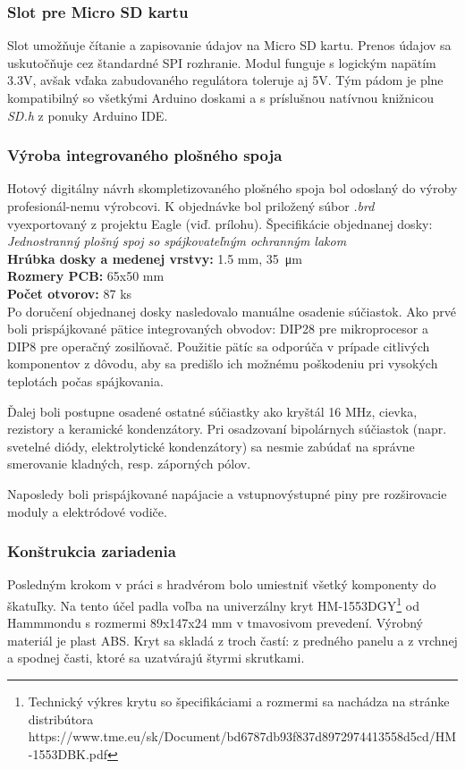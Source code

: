 \documentclass[titlepage,12pt]{article}
\begin{document}
\subsubsection*{Slot pre Micro SD kartu}
Slot umožňuje čítanie a zapisovanie údajov na Micro SD kartu. Prenos údajov sa uskutočňuje cez štandardné SPI rozhranie. Modul funguje s logickým napätím 3.3V, avšak vďaka zabudovaného regulátora toleruje aj 5V. Tým pádom je plne kompatibilný so všetkými Arduino doskami a s príslušnou natívnou knižnicou \emph{SD.h} z ponuky Arduino IDE.

\subsubsection*{Výroba integrovaného plošného spoja}
Hotový digitálny návrh skompletizovaného plošného spoja bol odoslaný do výroby profesionál-nemu výrobcovi. K objednávke bol priložený súbor \textit{.brd} vyexportovaný z projektu Eagle (viď. prílohu). Špecifikácie objednanej dosky: \\
\emph{Jednostranný plošný spoj so spájkovateľným ochranným lakom} \\
\textbf{Hrúbka dosky a medenej vrstvy:} 1.5 mm, \SI{35}{\micro\m} \\
\textbf{Rozmery PCB:} 65x50 mm \\
\textbf{Počet otvorov:} 87 ks \\

Po doručení objednanej dosky nasledovalo manuálne osadenie súčiastok. Ako prvé boli prispájkované pätice integrovaných obvodov: DIP28 pre mikroprocesor a DIP8 pre operačný zosilňovač. Použitie pätíc sa odporúča v prípade citlivých komponentov z dôvodu, aby sa predišlo ich možnému poškodeniu pri vysokých teplotách počas spájkovania.

Ďalej boli postupne osadené ostatné súčiastky ako kryštál 16 MHz, cievka, rezistory a keramické kondenzátory. Pri osadzovaní bipolárnych súčiastok (napr. svetelné diódy, elektrolytické kondenzátory) sa nesmie zabúdať na správne smerovanie kladných, resp. záporných pólov.

Naposledy boli prispájkované napájacie a vstupnovýstupné piny pre rozširovacie moduly \linebreak a elektródové vodiče.

\newpage
\subsubsection{Konštrukcia zariadenia}
Posledným krokom v práci s hradvérom bolo umiestniť všetký komponenty do škatuľky. Na tento účel padla voľba na univerzálny kryt HM-1553DGY\footnote{Technický výkres krytu so špecifikáciami a rozmermi sa nachádza na stránke distribútora \\ https://www.tme.eu/sk/Document/bd6787db93f837d8972974413558d5cd/HM-1553DBK.pdf} od Hammmondu s rozmermi \linebreak 89x147x24 mm v tmavosivom prevedení. Výrobný materiál je plast ABS. Kryt sa skladá \linebreak z troch častí: z predného panelu a z vrchnej a spodnej časti, ktoré sa uzatvárajú štyrmi skrutkami. 
\end{document}
